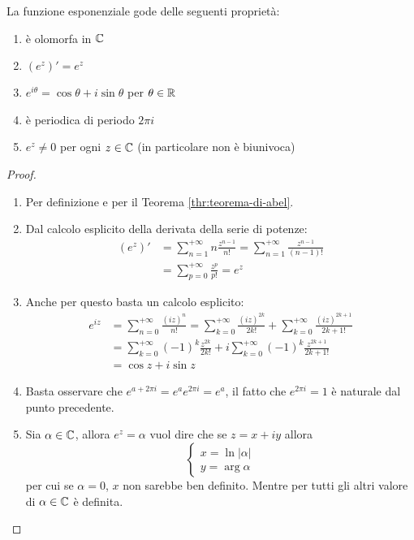 \begin{theorem}
	La funzione esponenziale gode delle seguenti proprietà:
	\begin{enumerate}
		\item è olomorfa in $\mathbb{C}$
		\item $(e^z)' = e^z$
		\item $e^{i\theta} = \cos \theta + i\sin \theta$ per $\theta \in \mathbb{R}$
		\item è periodica di periodo $2\pi i$
		\item $e^z \neq 0$ per ogni $z \in \mathbb{C}$ (in particolare non è biunivoca)
	\end{enumerate}
\end{theorem}
\begin{proof} \
	\begin{enumerate}
		\item Per definizione e per il Teorema \ref{thr:teorema-di-abel}.
		\item Dal calcolo esplicito della derivata della serie di potenze:
		$$\begin{aligned} (e^z)' & = \sum^{+\infty}_{n=1} n\frac{z^{n-1}}{n!} = \sum^{+\infty}_{n=1} \frac{z^{n-1}}{(n-1)!} \\
		& = \sum^{+\infty}_{p=0} \frac{z^p}{p!} = e^z \end{aligned}$$
		\item Anche per questo basta un calcolo esplicito: \begin{equation*}
		\begin{aligned}
		e^{iz} & = \sum^{+\infty}_{n=0} \frac{(iz)^{n}}{n!} = \sum^{+\infty}_{k=0} \frac{(iz)^{2k}}{2k!} + \sum^{+\infty}_{k=0} \frac{(iz)^{2k+1}}{2k+1!}\\
		& = \sum^{+\infty}_{k=0} (-1)^k\frac{z^{2k}}{2k!} + i\sum^{+\infty}_{k=0} (-1)^k\frac{z^{2k+1}}{2k+1!}\\
		& = \cos z + i \sin z
		\end{aligned}
		\end{equation*}
		\item Basta osservare che $e^{a + 2\pi i} = e^a e^{2\pi i } = e^a$, il fatto che $e^{2\pi i} = 1$ è naturale dal punto precedente.
		\item 	Sia $\alpha \in \mathbb{C}$, allora $e^z = \alpha$ vuol dire che se $z = x+iy$ allora 
		\begin{equation*}
		\begin{cases}
		x = \ln |\alpha|\\
		y = \arg \alpha
		\end{cases}
		\end{equation*}
		per cui se $\alpha = 0$, $x$ non sarebbe ben definito. Mentre per tutti gli altri valore di $\alpha \in \mathbb{C}$ è definita.
		
	\end{enumerate}
\end{proof}

